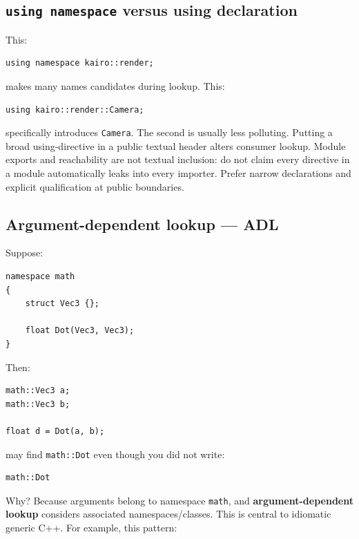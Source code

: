 \subsection{\texorpdfstring{\texttt{using\ namespace} versus using declaration}{using namespace versus using declaration}}\label{01-foundations-i-ch002-using-namespace-versus-using-declaration}

This:

\begin{verbatim}
using namespace kairo::render;
\end{verbatim}

makes many names candidates during lookup. This:

\begin{verbatim}
using kairo::render::Camera;
\end{verbatim}

specifically introduces \texttt{Camera}. The second is usually less polluting. Putting a broad using-directive in a public textual header alters consumer lookup. Module exports and reachability are not textual inclusion: do not claim every directive in a module automatically leaks into every importer. Prefer narrow declarations and explicit qualification at public boundaries.

\subsection{Argument-dependent lookup --- ADL}\label{01-foundations-i-ch002-argument-dependent-lookup-adl}

Suppose:

\begin{verbatim}
namespace math
{
    struct Vec3 {};

    float Dot(Vec3, Vec3);
}
\end{verbatim}

Then:

\begin{verbatim}
math::Vec3 a;
math::Vec3 b;

float d = Dot(a, b);
\end{verbatim}

may find \texttt{math::Dot} even though you did not write:

\begin{verbatim}
math::Dot
\end{verbatim}

Why? Because arguments belong to namespace \texttt{math}, and \textbf{argument-dependent lookup} considers associated namespaces/classes. This is central to idiomatic generic C++. For example, this pattern:

